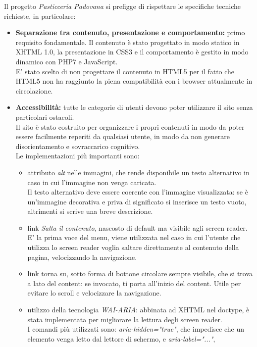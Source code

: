Il progetto \emph{Pasticceria Padovana} si prefigge di rispettare le specifiche tecniche richieste, in particolare:
\begin{itemize}
	\item \textbf{Separazione tra contenuto, presentazione e comportamento:} primo requisito fondamentale. 
	Il contenuto è stato progettato in modo statico in XHTML 1.0, la presentazione in CSS3 e il comportamento è gestito in modo dinamico con PHP7 e JavaScript.\\
	E' stato scelto di non progettare il contenuto in HTML5 per il fatto che HTML5 non ha raggiunto la piena compatibilità con i browser attualmente in circolazione.\\
	\item \textbf{Accessibilità:} tutte le categorie di utenti devono poter utilizzare il sito senza particolari ostacoli.\\ 
	Il sito è stato costruito per organizzare i propri contenuti in modo da poter essere facilmente reperiti da qualsiasi utente, 
	in modo da non generare disorientamento e sovraccarico cognitivo.\\ 
	Le implementazioni più importanti sono:
	\begin{itemize}
		\item attributo \emph{alt} nelle immagini, che rende disponibile un testo alternativo in caso in cui l'immagine non venga caricata.\\ 
		Il testo alternativo deve essere coerente con l'immagine visualizzata: se è un'immagine decorativa e priva di significato si inserisce un testo vuoto, 
		altrimenti si scrive una breve descrizione.
		\item link \emph{Salta il contenuto}, nascosto di default ma visibile agli screen reader. E' la prima voce del menu, viene utilizzata nel caso in cui l'utente che
		utilizza lo screen reader voglia saltare direttamente al contenuto della pagina, velocizzando la navigazione.
		\item link {torna su}, sotto forma di bottone circolare sempre visibile, che si trova a lato del content: se invocato, ti porta all'inizio del content. 
		Utile per evitare lo scroll e velocizzare la navigazione.
		\item utilizzo della tecnologia \emph{WAI-ARIA}: abbinata ad XHTML nel doctype, è stata implementata per migliorare la lettura degli screen reader.\\
		I comandi più utilizzati sono: \emph{aria-hidden="true"}, che impedisce che un elemento venga letto dal lettore di schermo, e \emph{aria-label="..."}, 

\end{itemize}
\end{itemize}
